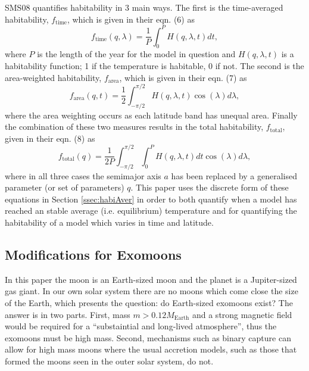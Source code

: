 \documentclass[12pt, onecolumn]{revtex4-2}    %
\begin{document}
SMS08 quantifies habitability in 3 main ways.
The first is the time-averaged habitability, $f_\text{time}$, which is given in their eqn. (6) as
\begin{equation}
  f_\text{time}(q, \lambda) = \frac{1}{P} \int_{0}^{P} H(q, \lambda, t) dt,
  \label{eqn:timeaverage}
\end{equation}
where $P$ is the length of the year for the model in question and $H(q, \lambda, t)$ is a habitability function; 1 if the temperature is habitable, 0 if not.
The second is the area-weighted habitability, $f_\text{area}$, which is given in their eqn. (7) as
\begin{equation}
  f_\text{area}(q, t) = \frac{1}{2} \int_{-\pi/2}^{\pi/2} H(q, \lambda, t) \cos(\lambda)d\lambda,
  \label{eqn:areaaverage}
\end{equation}
where the area weighting occurs as each latitude band has unequal area.
Finally the combination of these two measures results in the total habitability, $f_\text{total}$, given in their eqn. (8) as
\begin{equation}
  f_\text{total}(q) = \frac{1}{2P} \int_{-\pi/2}^{\pi/2} \int_{0}^{P} H(q, \lambda, t) dt \cos(\lambda)d\lambda,
  \label{eqn:totalaverage}
\end{equation}
where in all three cases the semimajor axis $a$ has been replaced by a generalised parameter (or set of parameters) $q$.
This paper uses the discrete form of these equations in Section \ref{ssec:habiAver} in order to both quantify when a model has reached an stable average (i.e. equilibrium) temperature and for quantifying the habitability of a model which varies in time and latitude.

\subsection{Modifications for Exomoons} \label{ssec:ModificationsForExomoons}
In this paper the moon is an Earth-sized moon and the planet is a Jupiter-sized gas giant.
In our own solar system there are no moons which come close the size of the Earth, which presents the question: do Earth-sized exomoons exist?
The answer is in two parts.
First, mass $m > 0.12 M_\text{Earth}$ and a strong magnetic field \cite{WKW1997} would be required for a ``substaintial and long-lived atmosphere'', thus the exomoons must be high mass.
Second, mechanisms such as binary capture \cite{Williams2013} can allow for high mass moons where the usual accretion models, such as those that formed the moons seen in the outer solar system, do not. 
\end{document}
